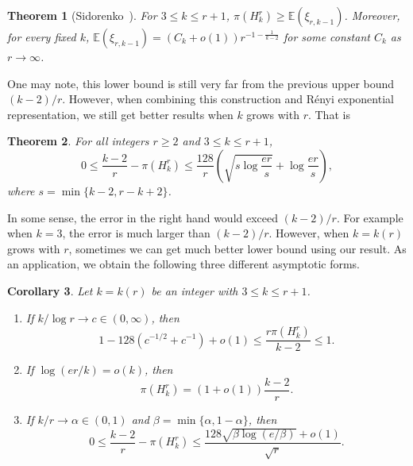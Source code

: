 \documentclass[12pt,a4paper]{article}
\numberwithin{equation}{section}
\newtheorem{theorem}{Theorem}[section]
\newtheorem{corollary}[theorem]{Corollary}
\theoremstyle{definition}
\theoremstyle{remark}
\begin{document}
\begin{theorem}[Sidorenko~\cite{Sidorenko2024}]\label{thm:sidorenko}
For $3\le k\le r+1$, $\pi(H_k^r)\ge\mathbb{E}(\xi_{r,k-1})$. Moreover, for every fixed $k$, 
$\mathbb{E}(\xi_{r,k-1})=(C_k+o(1))r^{-1-\frac{1}{k-2}}$ for some constant $C_k$ as $r\to \infty$.
\end{theorem}


One may note, this lower bound is still very far from the previous upper bound  $(k-2)/r$.
However, when combining this construction and R\'enyi exponential representation, we still get better results when $k$ grows with $r$. That is 

\begin{theorem}\label{thm:main}
For all integers $r\ge2$ and $3\le k\le r+1$, 
\begin{equation*}
 0\le \frac{k-2}{r}-\pi(H_k^r)\le \frac{128}{r}\left(\sqrt{s \log\frac{er}{s}}+\log\frac{er}{s}\right),
\end{equation*}
where $s=\min\{k-2,r-k+2\}$.
\end{theorem}


In some sense, the error in the right hand would exceed $(k-2)/r$. For example when $k=3$, the error is much larger than $(k-2)/r$. However, when $k=k(r)$ grows with $r$, sometimes we can get much better lower bound using our result.   As an application, we obtain the following three different asymptotic forms.


\begin{corollary}\label{cor:applications}
Let $k=k(r)$ be an integer with $3\le k\le r+1$.
\begin{enumerate}[label=\textup{(\roman*)}]
\item If $k/\log r\to c\in(0,\infty)$, then
\begin{equation*}
1-128\left(c^{-1/2}+c^{-1}\right)+o(1)
\le \frac{r\pi(H_k^r)}{k-2}\le1.
\end{equation*}
\item If $\log(er/k)=o(k)$, then
\begin{equation*}
\pi(H_k^r)=(1+o(1))\frac{k-2}{r}.
\end{equation*}
\item If $k/r\to\alpha\in(0,1)$ and $\beta=\min\{\alpha,1-\alpha\}$, then
\begin{equation*}
0\le\frac{k-2}{r}-\pi(H_k^r)
\le\frac{128\sqrt{\beta\log(e/\beta)}+o(1)}{\sqrt r}.
\end{equation*}
\end{enumerate}
\end{corollary}
\end{document}
